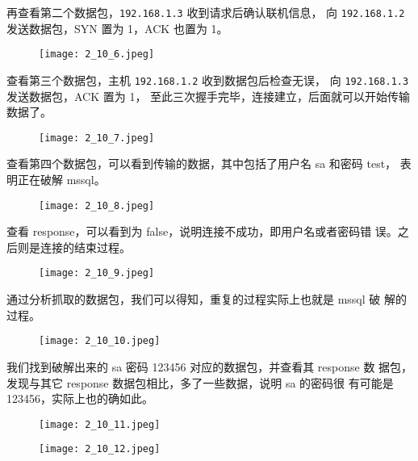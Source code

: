 再查看第二个数据包，\texttt{192.168.1.3} 收到请求后确认联机信息，
向 \texttt{192.168.1.2} 发送数据包，SYN 置为 1，ACK 也置为 1。
\begin{figure}[H]
  \begin{center}
    \texttt{[image: 2\_10\_6.jpeg]}
  \end{center}
\end{figure}

查看第三个数据包，主机 \texttt{192.168.1.2} 收到数据包后检查无误，
向 \texttt{192.168.1.3} 发送数据包，ACK 置为 1，
至此三次握手完毕，连接建立，后面就可以开始传输数据了。
\begin{figure}[H]
  \begin{center}
    \texttt{[image: 2\_10\_7.jpeg]}
  \end{center}
\end{figure}

查看第四个数据包，可以看到传输的数据，其中包括了用户名 sa 和密码 test，
表明正在破解 mssql。
\begin{figure}[H]
  \begin{center}
    \texttt{[image: 2\_10\_8.jpeg]}
  \end{center}
\end{figure}

查看 response，可以看到为 false，说明连接不成功，即用户名或者密码错
误。之后则是连接的结束过程。
\begin{figure}[H]
  \begin{center}
    \texttt{[image: 2\_10\_9.jpeg]}
  \end{center}
\end{figure}

通过分析抓取的数据包，我们可以得知，重复的过程实际上也就是 mssql 破
解的过程。
\begin{figure}[H]
  \begin{center}
    \texttt{[image: 2\_10\_10.jpeg]}
  \end{center}
\end{figure}

我们找到破解出来的 sa 密码 123456 对应的数据包，并查看其 response 数
据包，发现与其它 response 数据包相比，多了一些数据，说明 sa 的密码很
有可能是 123456，实际上也的确如此。
\begin{figure}[H]
  \begin{center}
    \texttt{[image: 2\_10\_11.jpeg]}
  \end{center}
\end{figure}
\begin{figure}[H]
  \begin{center}
    \texttt{[image: 2\_10\_12.jpeg]}
  \end{center}
\end{figure}
%
